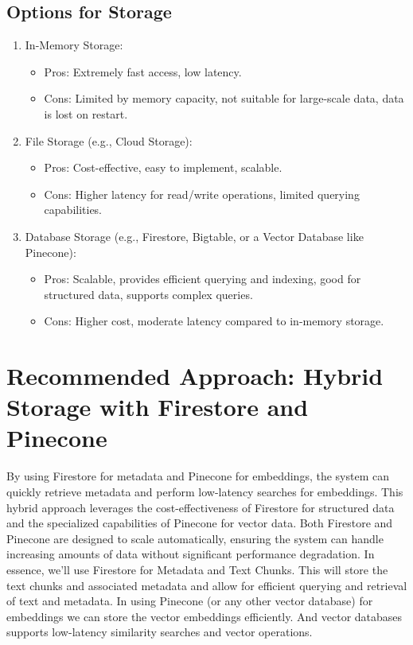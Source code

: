 \documentclass[a4paper, 12pt]{report}
\begin{document}
\subsection{Options for Storage}
\begin{enumerate}
    \item In-Memory Storage:
    \begin{itemize}
        \item Pros: Extremely fast access, low latency.
        \item Cons: Limited by memory capacity, not suitable for large-scale data, data is lost on restart.
    \end{itemize}
    \item File Storage (e.g., Cloud Storage):
    \begin{itemize}
        \item Pros: Cost-effective, easy to implement, scalable.
        \item Cons: Higher latency for read/write operations, limited querying capabilities.
    \end{itemize}
    \item Database Storage (e.g., Firestore, Bigtable, or a Vector Database like Pinecone):
    \begin{itemize}
        \item Pros: Scalable, provides efficient querying and indexing, good for structured data, supports complex queries.
        \item Cons: Higher cost, moderate latency compared to in-memory storage.
    \end{itemize}
\end{enumerate}

\section{Recommended Approach: Hybrid Storage with Firestore and Pinecone}

By using Firestore for metadata and Pinecone for embeddings, the system can quickly retrieve metadata and perform low-latency searches for embeddings. This hybrid approach leverages the cost-effectiveness of Firestore for structured data and the specialized capabilities of Pinecone for vector data. Both Firestore and Pinecone are designed to scale automatically, ensuring the system can handle increasing amounts of data without significant performance degradation. In essence, we'll use Firestore for Metadata and Text Chunks. This will store the text chunks and associated metadata and allow for efficient querying and retrieval of text and metadata. In using Pinecone (or any other vector database) for embeddings we can store the vector embeddings efficiently. And vector databases supports low-latency similarity searches and vector operations.
\end{document}

